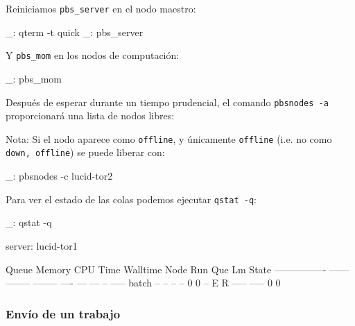 Reiniciamos \texttt{pbs\_server} en el nodo maestro:

\begin{bashcode}
_: qterm -t quick
_: pbs_server
\end{bashcode}

Y \texttt{pbs\_mom} en los nodos de computación:

\begin{bashcode}
_: pbs_mom
\end{bashcode}

Después de esperar durante un tiempo prudencial, el comando \texttt{pbsnodes -a} proporcionará una lista de nodos libres:


Nota: Si el nodo aparece como \texttt{offline}, y únicamente \texttt{offline} (i.e. no como \texttt{down, offline}) se puede liberar con:

\begin{bashcode}
_: pbsnodes -c lucid-tor2
\end{bashcode}

Para ver el estado de las colas podemos ejecutar \texttt{qstat -q}:

\begin{bashcode}
_: qstat -q

server: lucid-tor1

Queue            Memory CPU Time Walltime Node  Run Que Lm  State
---------------- ------ -------- -------- ----  --- --- --  -----
batch              --      --       --      --    0   0 --   E R
                                               ----- -----
                                                   0     0
\end{bashcode}


\subsubsection{Envío de un trabajo}

